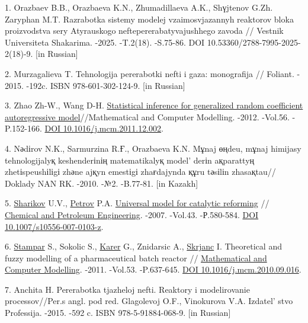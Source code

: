 \begin{refs}
1. Orazbaev B.B., Orazbaeva K.N., Zhumadillaeva A.K., Shүjtenov G.Zh.
Zaryphan M.T. Razrabotka sistemy modelej vzaimosvjazannyh reaktorov
bloka proizvodstva sery Atyrauskogo neftepererabatyvajushhego zavoda //
Vestnik Universiteta Shakarima. -2025. -T.2(18). -S.75-86. DOI
10.53360/2788-7995-2025-2(18)-9. {[}in Russian{]}

2. Murzagalieva T. Tehnologija pererabotki nefti i gaza: monografija //
Foliant. - 2015. -192c. ISBN 978-601-302-124-9. {[}in Russian{]}

3. Zhao Zh-W., Wang D-H.
\href{http://www.sciencedirect.com/science/article/pii/S0895717711007655}{Statistical
inference for generalized random coefficient autoregressive
model}//Mathematical and Computer Modelling. -2012. -Vol.56. -P.152-166.
\href{https://doi.org/10.1016/j.mcm.2011.12.002}{DOI
10.1016/j.mcm.2011.12.002}.

4. Nәdіrov N.K., Sarmurzina R.Ғ., Orazbaeva K.N. Mұnaj өңdeu, mұnaj
himijasy tehnologijalyқ keshenderіnің matematikalyқ
model' derіn aқparattyң zhetіspeushіlіgі zhәne ajқyn
emestіgі zhaғdajynda құru tәsіlіn zhasaқtau// Doklady NAN RK. -2010.
-№2. -B.77-81. {[}in Kazakh{]}

5. \href{http://www.springerlink.com/content/?Author=Yu.+V.+Sharikov}{Sharikov}
U.V.,
\href{http://www.springerlink.com/content/?Author=P.+A.+Petrov}{Petrov}
P.A.
\href{http://www.springerlink.com/content/br0wn2h316r1v65x/}{Universal
model for catalytic reforming} //
\href{http://www.springerlink.com/content/0009-2355/}{Chemical and
Petroleum Engineering}. -2007. -Vol.43. -Р.580-584.
\href{https://doi.org/10.1007/s10556-007-0103-z}{DOI
10.1007/s10556-007-0103-z}.

6. \href{http://www.sciencedirect.com/science/article/pii/S0895717710004474}{Stampar}
S., Sokolic S.,
\href{http://www.sciencedirect.com/science/article/pii/S0895717710004474}{Karer}
G., Znidarsic A.,
\href{http://www.sciencedirect.com/science/article/pii/S0895717710004474}{Skrjanc}
I. Theoretical and fuzzy modelling of a pharmaceutical batch reactor //
\href{http://www.sciencedirect.com/science/journal/08957177}{Mathematical
and Computer Modelling}. -2011. -Vol.53. -P.637-645.
\href{https://doi.org/10.1016/j.mcm.2010.09.016}{DOI
10.1016/j.mcm.2010.09.016}.

7. Anchita H. Pererabotka tjazheloj nefti. Reaktory i modelirovanie
processov//Per.s angl. pod red. Glagolevoj O.F., Vinokurova V.A.
Izdatel' stvo Professija. -2015. -592 c. ISBN
978-5-91884-068-9. {[}in Russian{]}


\end{refs}
